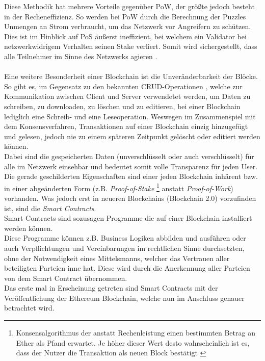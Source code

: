 Diese Methodik hat mehrere Vorteile gegenüber PoW, der größte jedoch besteht in der Recheneffizienz. So werden bei PoW durch die Berechnung der Puzzles Unmengen an Strom verbraucht, um das Netzwerk vor Angreifern zu schützen. Dies ist im Hinblick auf PoS äußerst ineffizient, bei welchem ein Validator bei netzwerkwidrigem Verhalten seinen Stake verliert. Somit wird sichergestellt, dass alle Teilnehmer im Sinne des Netzwerks agieren \cite{PoS:BCMAG,PoS:EthWiki}. \\\\
Eine weitere Besonderheit einer Blockchain ist die Unveränderbarkeit der Blöcke. So gibt es, im Gegensatz zu den bekannten CRUD-Operationen \cite{CRUD:Wiki}, welche zur Kommunikation zwischen Client und Server verwendetet werden, um Daten zu schreiben, zu downloaden, zu löschen und zu editieren, bei einer Blockchain lediglich eine Schreib- und eine Leseoperation. Weswegen im Zusammenspiel mit dem Konsensverfahren, Transaktionen auf einer Blockchain einzig hinzugefügt und gelesen, jedoch nie zu einem späteren Zeitpunkt gelöscht oder editiert werden können. \\
Dabei sind die gespeicherten Daten (unverschlüsselt oder auch verschlüsselt) für alle im Netzwerk einsehbar und bedeutet somit volle Transparenz für jeden User. \\ 
Die gerade geschilderten Eigenschaften sind einer jeden Blockchain inhärent bzw. in einer abgeänderten Form (z.B. \textit{Proof-of-Stake} \footnote{Konsensalgorithmus der anstatt Rechenleistung einen bestimmten Betrag an Ether als Pfand erwartet. Je höher dieser Wert desto wahrscheinlich ist es, dass der Nutzer die Transaktion als neuen Block bestätigt \cite{PoS:BTCE,PoS:Wiki}} anstatt \textit{Proof-of-Work}) vorhanden. 
Was jedoch erst in neueren Blockchains (Blockchain 2.0) vorzufinden ist, sind die \textit{Smart Contracts}.\\
Smart Contracts sind sozusagen Programme die auf einer Blockchain installiert werden können.\\
Diese Programme können z.B. Business Logiken abbilden und ausführen oder auch Verpflichtungen und Vereinbarungen im rechtlichen Sinne durchsetzten, ohne der Notwendigkeit eines Mittelsmanns, welcher das Vertrauen aller beteiligten Parteien inne hat. Diese  wird durch die Anerkennung aller Parteien von dem Smart Contract übernommen. \\
Das erste mal in Erscheinung getreten sind Smart Contracts mit der Veröffentlichung der Ethereum Blockchain, welche nun im Anschluss genauer betrachtet wird.

